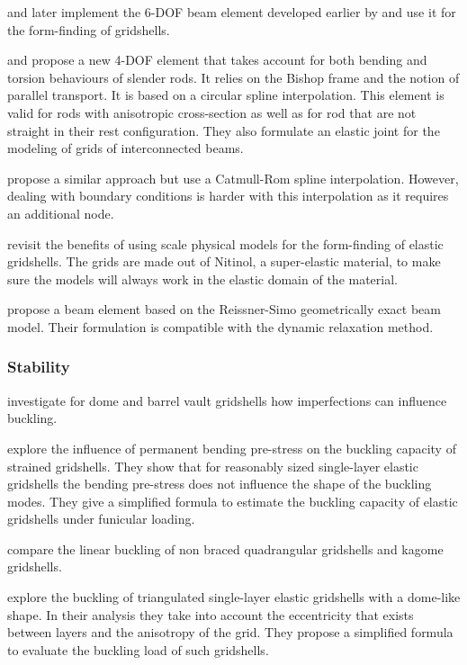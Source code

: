  and later  implement the 6-DOF beam element developed earlier by  and use it for the form-finding of gridshells.

 and  propose a new 4-DOF element that takes account for both bending and torsion behaviours of slender rods. It relies on the Bishop frame and the notion of parallel transport. It is based on a circular spline interpolation. This element is valid for rods with anisotropic cross-section as well as for rod that are not straight in their rest configuration. They also formulate an elastic joint for the modeling of grids of interconnected beams.

 propose a similar approach but use a Catmull-Rom spline interpolation. However, dealing with boundary conditions is harder with this interpolation as it requires an additional node.

 revisit the benefits of using scale physical models for the form-finding of elastic gridshells. The grids are made out of Nitinol, a super-elastic material, to make sure the models will always work in the elastic domain of the material.

 propose a beam element based on the Reissner-Simo geometrically exact beam model. Their formulation is compatible with the dynamic relaxation method.

\subsubsection{Stability}

 investigate for dome and barrel vault gridshells how imperfections can influence buckling.

 explore the influence of permanent bending pre-stress on the buckling capacity of strained gridshells. They show that for reasonably sized single-layer elastic gridshells the bending pre-stress does not influence the shape of the buckling modes. They give a simplified formula to estimate the buckling capacity of elastic gridshells under funicular loading.

 compare the linear buckling of non braced quadrangular gridshells and kagome gridshells.

\citet{Lefevre2015} explore the buckling of triangulated single-layer elastic gridshells with a dome-like shape. In their analysis they take into account the eccentricity that exists between layers and the anisotropy of the grid. They propose a simplified formula to evaluate the buckling load of such gridshells.

